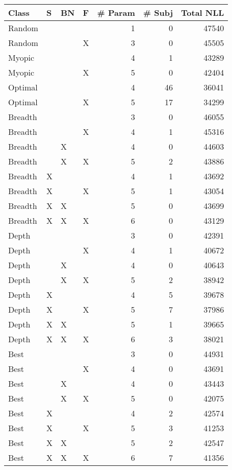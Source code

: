 \begin{tabular}{llllrrr}
\toprule
   Class &  S & BN &  F &  \# Param &  \# Subj &  Total NLL \\
\midrule
  Random &    &    &    &        1 &       0 &      47540 \\
  Random &    &    &  X &        3 &       0 &      45505 \\
  Myopic &    &    &    &        4 &       1 &      43289 \\
  Myopic &    &    &  X &        5 &       0 &      42404 \\
 Optimal &    &    &    &        4 &      46 &      36041 \\
 Optimal &    &    &  X &        5 &      17 &      34299 \\
 Breadth &    &    &    &        3 &       0 &      46055 \\
 Breadth &    &    &  X &        4 &       1 &      45316 \\
 Breadth &    &  X &    &        4 &       0 &      44603 \\
 Breadth &    &  X &  X &        5 &       2 &      43886 \\
 Breadth &  X &    &    &        4 &       1 &      43692 \\
 Breadth &  X &    &  X &        5 &       1 &      43054 \\
 Breadth &  X &  X &    &        5 &       0 &      43699 \\
 Breadth &  X &  X &  X &        6 &       0 &      43129 \\
   Depth &    &    &    &        3 &       0 &      42391 \\
   Depth &    &    &  X &        4 &       1 &      40672 \\
   Depth &    &  X &    &        4 &       0 &      40643 \\
   Depth &    &  X &  X &        5 &       2 &      38942 \\
   Depth &  X &    &    &        4 &       5 &      39678 \\
   Depth &  X &    &  X &        5 &       7 &      37986 \\
   Depth &  X &  X &    &        5 &       1 &      39665 \\
   Depth &  X &  X &  X &        6 &       3 &      38021 \\
    Best &    &    &    &        3 &       0 &      44931 \\
    Best &    &    &  X &        4 &       0 &      43691 \\
    Best &    &  X &    &        4 &       0 &      43443 \\
    Best &    &  X &  X &        5 &       0 &      42075 \\
    Best &  X &    &    &        4 &       2 &      42574 \\
    Best &  X &    &  X &        5 &       3 &      41253 \\
    Best &  X &  X &    &        5 &       2 &      42547 \\
    Best &  X &  X &  X &        6 &       7 &      41356 \\
\bottomrule
\end{tabular}
\unskip